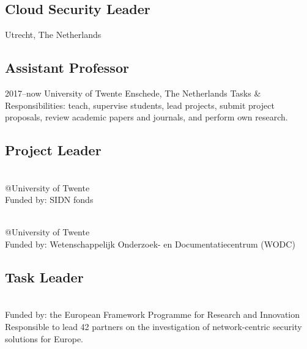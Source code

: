 \documentclass[print]{styles/friggeri-cv-linux} %
\begin{document}
\subsection{Cloud Security Leader}\vspace{-5pt}
\begin{entrylist}
{Utrecht, The Netherlands}
{}
\end{entrylist}
\subsection{Assistant Professor}\vspace{-5pt}
\begin{entrylist}
	\entry
	{2017--now}
	{University of Twente}
	{Enschede, The Netherlands}
	{Tasks \& Responsibilities: teach, supervise students, lead projects, submit project proposals, review academic papers and journals, and perform own research.} 
\end{entrylist}
\newpage
\subsection{Project Leader}\vspace{-5pt}
\begin{entrylist}

{\\@University of Twente\\Funded by: SIDN fonds}%
{}

{\\@University of Twente\\Funded by: Wetenschappelijk Onderzoek- en Documentatiecentrum (WODC)}%
{}
\end{entrylist}
\subsection{Task Leader}\vspace{-5pt}
\begin{entrylist}
{\\Funded by: the European Framework Programme for Research and Innovation}
{Responsible to lead 42 partners on the investigation of network-centric security solutions for Europe.}%
\end{entrylist}
\end{document}

